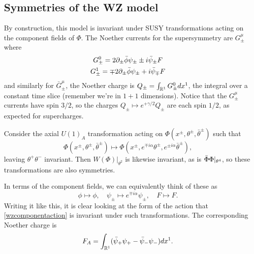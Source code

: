 \subsection*{Symmetries of the WZ model}
By construction, this model is invariant under SUSY transformations acting on the component fields of $\Phi$. The Noether currents for the supersymmetry are $G^\mu_\pm$ where
\begin{gather}
    G^0_\pm = 2\partial_\pm \bar \phi \psi_\pm \pm i \bar \psi_\pm F\\
    G^1_\pm =  \mp 2 \partial_\pm \bar \phi \psi_\pm + i \bar \psi_\mp F
\end{gather}
and similarly for $\bar G^\mu_\pm$, the Noether charge is $Q_\pm = \int_{\mathbb{R}^1} G^0_\pm dx^1$, the integral over a constant time slice (remember we're in $1+1$ dimensions). Notice that the $G^\mu_\pm$ currents have spin $3/2$, so the charges $Q_\pm\mapsto e^{+\gamma/2} Q_\pm$ are each spin $1/2$, as expected for supercharges.

Consider the axial $U(1)_A$ transformation acting on $\Phi(x^\pm, \theta^\pm, \bar \theta^\pm)$ such that
\begin{equation}
    \Phi(x^\pm, \theta^\pm, \bar \theta^\pm)\mapsto \Phi(x^\pm, e^{\mp i \alpha}\theta^\pm, e^{\pm i \alpha}\bar \theta^\pm),
\end{equation}
leaving $\theta^+ \theta^-$ invariant. Then $W(\Phi)|_{\theta^2}$ is likewise invariant, as is $\Bar \Phi \Phi|_{\theta^4}$, so these transformations are also symmetries.

In terms of the component fields, we can equivalently think of these as
\begin{equation}
    \phi \mapsto \phi, \quad \psi_\pm \mapsto e^{\mp i\alpha}\psi_{\pm}, \quad F\mapsto F.
\end{equation}
Writing it like this, it is clear looking at the form of the action that \ref{wzcomponentaction} is invariant under such transformations. The corresponding Noether charge is
\begin{equation}
    F_A = \int_{\mathbb{R}^1} (\bar \psi_+ \psi_+ - \bar \psi_- \psi_-) dx^1.
\end{equation}

